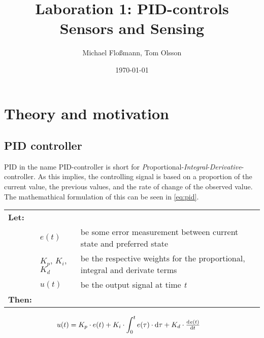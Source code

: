 \documentclass[11pt]{article}
\title{Laboration 1: PID-controls\\ {\small Sensors and Sensing}}
\author{Michael Flo{\ss}mann, Tom Olsson}
\date{\today}
\begin{document}
\maketitle %
\listoffigures %
\lstlistoflistings %
\lstset{ matchrangestart=t} %
\section{Theory and motivation}
\subsection{PID controller}
PID in the name PID-controller is short for \emph{P}roportional-\emph{Integral}-\emph{Derivative}-controller. As this implies, the controlling signal is based on a proportion of the current value, the previous values, and the rate of change of the observed value. The mathemathical formulation of this can be seen in \vref{eq:pid}.\par \vspace{10pt}
{\footnotesize
  \begin{tabular}{l l l}
    \textbf{Let:} \\
 &$e(t)$ &be some error measurement between current state and preferred state\\
 &$K_p$, $K_i$, $K_d$ &be the respective weights for the proportional, integral and derivate terms \\
 &$u(t)$ &be the output signal at time \emph{t} \\
    \textbf{Then:}
  \end{tabular}
  \begin{align}
    u(t) &= K_p\cdot e(t) + K_i \cdot\int_{0}^{t}e(\tau)\cdot \dif\tau + K_d \cdot \od{e(t)}{t}\label{eq:pid}
  \end{align}}
\par
\end{document}
